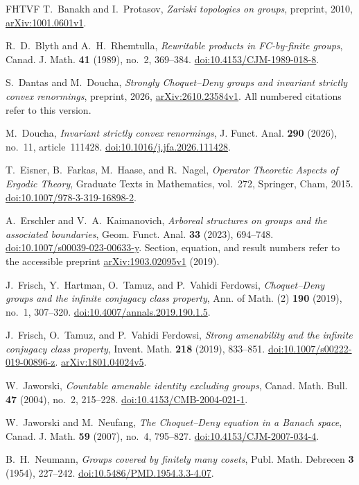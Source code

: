 \documentclass[11pt,letterpaper]{amsart}
\theoremstyle{definition}
\theoremstyle{remark}
\begin{document}
\begin{thebibliography}{FHTVF}
T.~Banakh and I.~Protasov,
\emph{Zariski topologies on groups},
preprint, 2010,
\href{https://arxiv.org/abs/1001.0601v1}{arXiv:1001.0601v1}.

R.~D.~Blyth and A.~H.~Rhemtulla,
\emph{Rewritable products in FC-by-finite groups},
Canad. J. Math. \textbf{41} (1989), no.~2, 369--384.
\href{https://doi.org/10.4153/CJM-1989-018-8}{doi:10.4153/CJM-1989-018-8}.

S.~Dantas and M.~Doucha,
\emph{Strongly Choquet--Deny groups and invariant strictly convex renormings},
preprint, 2026,
\href{https://arxiv.org/abs/2610.23584v1}{arXiv:2610.23584v1}.
All numbered citations refer to this version.

M.~Doucha,
\emph{Invariant strictly convex renormings},
J. Funct. Anal. \textbf{290} (2026), no.~11, article~111428.
\href{https://doi.org/10.1016/j.jfa.2026.111428}{doi:10.1016/j.jfa.2026.111428}.

T.~Eisner, B.~Farkas, M.~Haase, and R.~Nagel,
\emph{Operator Theoretic Aspects of Ergodic Theory},
Graduate Texts in Mathematics, vol.~272, Springer, Cham, 2015.
\href{https://doi.org/10.1007/978-3-319-16898-2}{doi:10.1007/978-3-319-16898-2}.

A.~Erschler and V.~A.~Kaimanovich,
\emph{Arboreal structures on groups and the associated boundaries},
Geom. Funct. Anal. \textbf{33} (2023), 694--748.
\href{https://doi.org/10.1007/s00039-023-00633-y}{doi:10.1007/s00039-023-00633-y}.
Section, equation, and result numbers refer to the accessible preprint
\href{https://arxiv.org/abs/1903.02095v1}{arXiv:1903.02095v1} (2019).

J.~Frisch, Y.~Hartman, O.~Tamuz, and P.~Vahidi Ferdowsi,
\emph{Choquet--Deny groups and the infinite conjugacy class property},
Ann. of Math. (2) \textbf{190} (2019), no.~1, 307--320.
\href{https://doi.org/10.4007/annals.2019.190.1.5}{doi:10.4007/annals.2019.190.1.5}.

J.~Frisch, O.~Tamuz, and P.~Vahidi Ferdowsi,
\emph{Strong amenability and the infinite conjugacy class property},
Invent. Math. \textbf{218} (2019), 833--851.
\href{https://doi.org/10.1007/s00222-019-00896-z}{doi:10.1007/s00222-019-00896-z}.
\href{https://arxiv.org/abs/1801.04024v5}{arXiv:1801.04024v5}.

W.~Jaworski,
\emph{Countable amenable identity excluding groups},
Canad. Math. Bull. \textbf{47} (2004), no.~2, 215--228.
\href{https://doi.org/10.4153/CMB-2004-021-1}{doi:10.4153/CMB-2004-021-1}.

W.~Jaworski and M.~Neufang,
\emph{The Choquet--Deny equation in a Banach space},
Canad. J. Math. \textbf{59} (2007), no.~4, 795--827.
\href{https://doi.org/10.4153/CJM-2007-034-4}{doi:10.4153/CJM-2007-034-4}.

B.~H.~Neumann,
\emph{Groups covered by finitely many cosets},
Publ. Math. Debrecen \textbf{3} (1954), 227--242.
\href{https://doi.org/10.5486/PMD.1954.3.3-4.07}{doi:10.5486/PMD.1954.3.3-4.07}.
\end{thebibliography}
\end{document}
